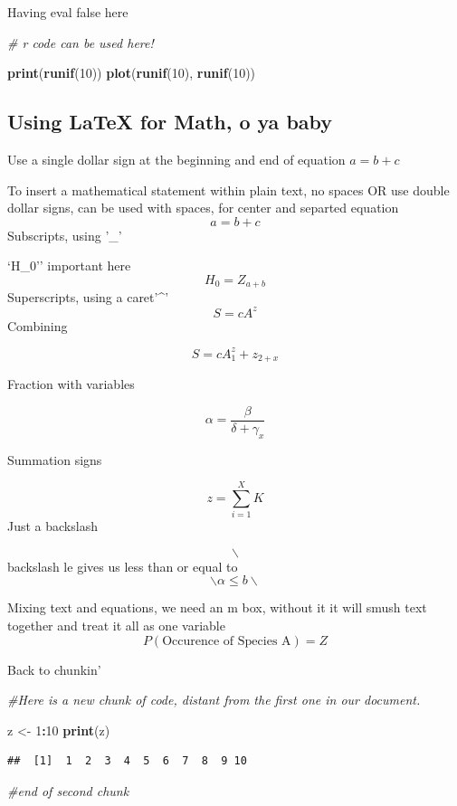 \documentclass[
]{article}
\newenvironment{Shaded}{\begin{snugshade}}{\end{snugshade}}
\newcommand{\CommentTok}[1]{\textcolor[rgb]{0.56,0.35,0.01}{\textit{#1}}}
\newcommand{\DecValTok}[1]{\textcolor[rgb]{0.00,0.00,0.81}{#1}}
\newcommand{\FunctionTok}[1]{\textcolor[rgb]{0.13,0.29,0.53}{\textbf{#1}}}
\newcommand{\NormalTok}[1]{#1}
\newcommand{\OtherTok}[1]{\textcolor[rgb]{0.56,0.35,0.01}{#1}}
\newcommand{\SpecialCharTok}[1]{\textcolor[rgb]{0.81,0.36,0.00}{\textbf{#1}}}
\begin{document}
Having eval false here

\begin{Shaded}
\begin{Highlighting}[]
\CommentTok{\# r code can be used here! }

\FunctionTok{print}\NormalTok{(}\FunctionTok{runif}\NormalTok{(}\DecValTok{10}\NormalTok{))}
\FunctionTok{plot}\NormalTok{(}\FunctionTok{runif}\NormalTok{(}\DecValTok{10}\NormalTok{), }\FunctionTok{runif}\NormalTok{(}\DecValTok{10}\NormalTok{))}
\end{Highlighting}
\end{Shaded}

\subsection{Using LaTeX for Math, o ya
baby}\label{using-latex-for-math-o-ya-baby}

Use a single dollar sign at the beginning and end of equation
\(a = b + c\)

To insert a mathematical statement within plain text, no spaces OR use
double dollar signs, can be used with spaces, for center and separted
equation \[ a = b + c \] Subscripts, using '\_'

`H\_0'' important here \[H_0 = Z_{a + b}\] Superscripts, using a
caret'\^{}' \[S = cA^z\] Combining

\[S=cA^z_1 + z_{2 + x}\]

Fraction with variables

\[\alpha = \frac{\beta}{\delta + \gamma_x}\]

Summation signs

\[z = \sum_{i=1}^X{K}\] Just a backslash

\[\backslash\] backslash le gives us less than or equal to
\[\backslash \alpha \le b \backslash\]

Mixing text and equations, we need an m box, without it it will smush
text together and treat it all as one variable
\[P(\mbox{Occurence of Species A}) = Z\]

Back to chunkin'

\begin{Shaded}
\begin{Highlighting}[]
\CommentTok{\#Here is a new chunk of code, distant from the first one in our document.}

\NormalTok{z }\OtherTok{\textless{}{-}} \DecValTok{1}\SpecialCharTok{:}\DecValTok{10}
\FunctionTok{print}\NormalTok{(z)}
\end{Highlighting}
\end{Shaded}

\begin{verbatim}
##  [1]  1  2  3  4  5  6  7  8  9 10
\end{verbatim}

\begin{Shaded}
\begin{Highlighting}[]
\CommentTok{\#end of second chunk}
\end{Highlighting}
\end{Shaded}
\end{document}
